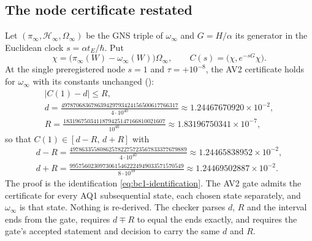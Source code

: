 \subsection{The node certificate restated}
\label{sec:bc1-node}
Let $(\pi_\infty,\mathcal H_\infty,\Omega_\infty)$ be the GNS triple of
$\omega_\infty$ and $G=H/\alpha$ its generator in the Euclidean clock
$s=\alpha t_E/\hbar$. Put
\begin{equation}
 \chi=\bigl(\pi_\infty(W)-\omega_\infty(W)\bigr)\Omega_\infty,\qquad
 C(s)=\bigl(\chi,e^{-sG}\chi\bigr).
 \label{eq:bc1-correlation}
\end{equation}
At the single preregistered node $s=1$ and $\tau=+10^{-8}$, the AV2
certificate holds for $\omega_\infty$ with its constants unchanged
():
\begin{equation}
 \begin{gathered}
 |C(1)-d|\le R,\\
 d=\frac{497870683678639429793424156500617766317}{4\cdot10^{40}}\approx1.24467670920\times10^{-2},\\
 R=\frac{1831967503411879425147166810021607}{10^{40}}\approx1.83196750341\times10^{-7},
 \end{gathered}
 \label{eq:bc1-node}
\end{equation}
so that $C(1)\in[d-R,\,d+R]$ with
\begin{equation}
 \begin{gathered}
 d-R=\frac{497863355808625782275723567833377679889}{4\cdot10^{40}}\approx1.24465838952\times10^{-2},\\
 d+R=\frac{99575602309730615462224949033571570549}{8\cdot10^{39}}\approx1.24469502887\times10^{-2}.
 \end{gathered}
 \label{eq:bc1-node-interval}
\end{equation}
The proof is the identification \eqref{eq:bc1-identification}. The AV2 gate
admits the certificate for every AQ1 subsequential state, each chosen state
separately, and $\omega_\infty$ is that state. Nothing is re-derived. The
checker parses $d$, $R$ and the interval ends from the gate, requires
$d\mp R$ to equal the ends exactly, and requires the gate's accepted
statement and decision to carry the same $d$ and $R$.

